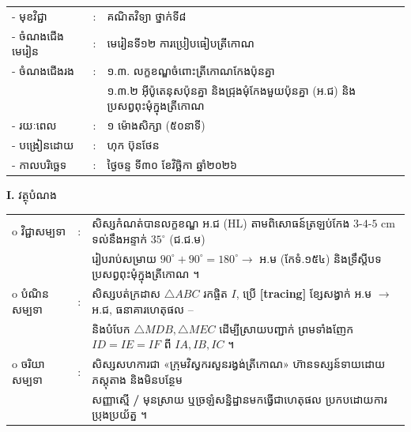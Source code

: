 \documentclass[a4paper,10pt]{article}
\newcommand{\wcirc}{{\CourierBullet\fontsize{9.5pt}{11pt}\selectfont o}}
\newcommand{\cnum}[1]{{\fontsize{10.5pt}{12pt}\selectfont\ding{\numexpr181+#1\relax}}\hspace{0.2em}}
\newcommand{\tri}[1]{\ensuremath{\triangle #1}}
\begin{document}
{\renewcommand{\arraystretch}{1.06}
\hspace*{3.30cm}%
\begin{tabular}{@{}l l l@{}}
  - \hspace{0.35cm} មុខវិជ្ជា & : & គណិតវិទ្យា ថ្នាក់ទី៨ \\
  - \hspace{0.35cm} ចំណងជើងមេរៀន & : & មេរៀនទី១២ ការប្រៀបធៀបត្រីកោណ \\
  - \hspace{0.35cm} ចំណងជើងរង & : & ១.៣. លក្ខខណ្ឌចំពោះត្រីកោណកែងប៉ុនគ្នា \\
  & & ១.៣.២ អ៊ីប៉ូតេនុសប៉ុនគ្នា និងជ្រុងមុំកែងមួយប៉ុនគ្នា (អ.ជ) និងប្រសព្វពុះមុំក្នុងត្រីកោណ \\
  - \hspace{0.35cm} រយៈពេល & : & ១ ម៉ោងសិក្សា (៥០នាទី) \\
  - \hspace{0.35cm} បង្រៀនដោយ & : & ហុក ប៊ុនថែន \\
  - \hspace{0.35cm} កាលបរិច្ឆេទ & : & ថ្ងៃចន្ទ ទី៣០ ខែវិច្ឆិកា ឆ្នាំ២០២៦ \\
\end{tabular}

\vspace{2pt}

\textbf{I.} {\muol វត្ថុបំណង}\\[2pt]
\hspace*{0.55cm}%
\begin{tabular}{@{}l l l@{}}
  \wcirc \hspace{0.25cm} វិជ្ជាសម្បទា & : & សិស្សកំណត់បានលក្ខខណ្ឌ អ.ជ (HL) តាមពិសោធន៍ត្រឡប់កែង $3$-$4$-$5\text{ cm}$ ទល់នឹងអន្ទាក់ $35^\circ$ (ជ.ជ.ម) \\
  & & រៀបរាប់សម្រាយ $90^\circ{+}90^\circ=180^\circ\to$ អ.ម (កែទំ.១៥៤) និងទ្រឹស្ដីបទប្រសព្វពុះមុំក្នុងត្រីកោណ ។ \\
  \wcirc \hspace{0.25cm} បំណិនសម្បទា & : & សិស្សបត់ក្រដាស $\tri{ABC}$ រកផ្ចិត $I$, ប្រើ \textbf{[tracing]} ខ្សែសង្វាក់ អ.ម $\to$ អ.ជ, ធនាគារហេតុផល \cnum{1}--\cnum{5} \\
  & & និងបំបែក $\tri{MDB}, \tri{MEC}$ ដើម្បីស្រាយបញ្ជាក់ ព្រមទាំងញែក $ID=IE=IF$ ពី $IA, IB, IC$ ។ \\
  \wcirc \hspace{0.25cm} ចរិយាសម្បទា & : & សិស្សសហការជា «ក្រុមវិស្វករសួនរង្វង់ត្រីកោណ» ហ៊ានទស្សន៍ទាយដោយភស្តុតាង និងមិនបន្ថែម \\
  & & សញ្ញាស្មើ \textbf{/} មុនស្រាយ ឬច្រឡំសន្និដ្ឋានមកធ្វើជាហេតុផល ប្រកបដោយការប្រុងប្រយ័ត្ន ។ \\
\end{tabular}

}
\end{document}
